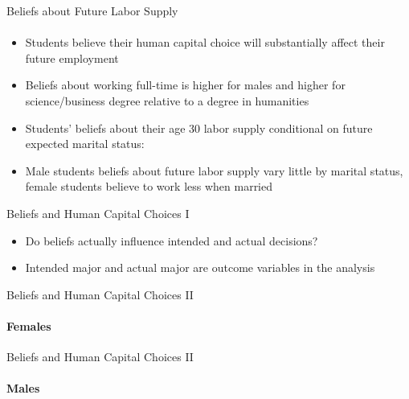 \documentclass[12pt]{beamer}
\begin{document}
\begin{frame}{Beliefs about Future Labor Supply}
    \framesubtitle{} 
    \begin{itemize}
        \item Students believe their human capital choice will substantially affect their future employment
        \item Beliefs about working full-time is higher for males and higher for science/business degree relative to a degree in humanities
        \item Students' beliefs about their age 30 labor supply conditional on future expected marital status:
        \item Male students beliefs about future labor supply vary little by marital status, female students believe to work less when married
    \end{itemize}
\end{frame}

\begin{frame}{Beliefs and Human Capital Choices I}
    \begin{itemize}
        \item Do beliefs actually influence intended and actual decisions?
        \item Intended major and actual major are outcome variables in the analysis
    \end{itemize}  
\end{frame}

\begin{frame}{Beliefs and Human Capital Choices II}
    \framesubtitle{Females}
     \begin{center}
    \end{center}
\end{frame}

\begin{frame}{Beliefs and Human Capital Choices II}
    \framesubtitle{Males}
    \begin{center}
    \end{center}
\end{frame}
\end{document}
